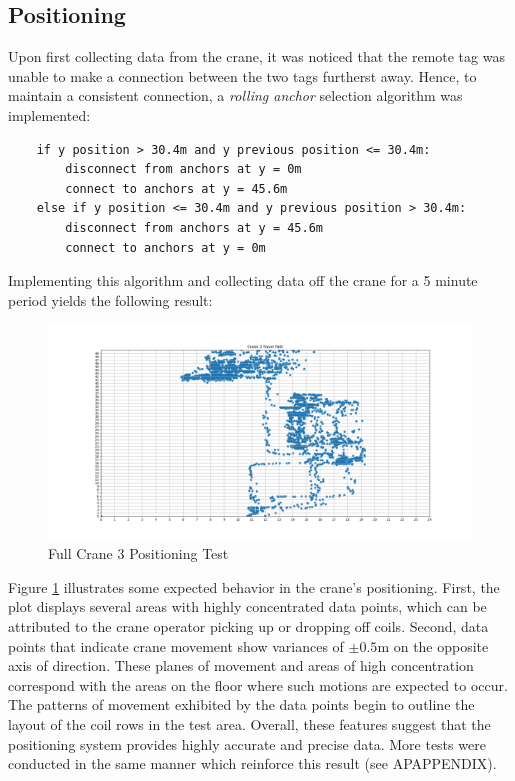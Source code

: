 \documentclass[12pt, a4paper]{article}
\begin{document}
\subsection{Positioning}
Upon first collecting data from the crane, it was noticed that the remote tag was unable to make a connection between the two tags furtherst away.
Hence, to maintain a consistent connection, a \textit{rolling anchor} selection algorithm was implemented:
\begin{lstlisting}
    if y position > 30.4m and y previous position <= 30.4m:
        disconnect from anchors at y = 0m 
        connect to anchors at y = 45.6m
    else if y position <= 30.4m and y previous position > 30.4m:
        disconnect from anchors at y = 45.6m
        connect to anchors at y = 0m
\end{lstlisting}
Implementing this algorithm and collecting data off the crane for a 5 minute period yields the following result:
\begin{figure}[H]
    \centering
    \includegraphics[width=1\textwidth]{PNGTest3.png}
    \caption{Full Crane 3 Positioning Test}
    \label{fig:crane3_test}
\end{figure}
Figure \ref{fig:crane3_test} illustrates some expected behavior in the crane's positioning. First, the plot displays several areas with highly concentrated data points, 
which can be attributed to the crane operator picking up or dropping off coils. Second, data points that indicate crane movement 
show variances of $\pm0.5$m on the opposite axis of direction. These planes of movement and areas of high concentration correspond with
the areas on the floor where such motions are expected to occur. The patterns of movement exhibited by the data points begin to outline 
the layout of the coil rows in the test area. Overall, these features suggest that the positioning system provides highly accurate and precise data.
More tests were conducted in the same manner which reinforce this result (see APAPPENDIX).
\end{document}
